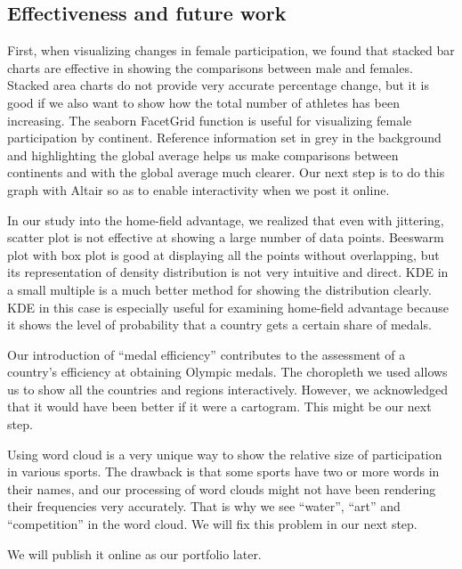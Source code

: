 \documentclass[12pt]{article}
\begin{document}
\subsection{Effectiveness and future work}
First, when visualizing changes in female participation, we found that stacked bar charts are effective in showing the comparisons between male and females. Stacked area charts do not provide very accurate percentage change, but it is good if we also want to show how the total number of athletes has been increasing. The seaborn FacetGrid function is useful for visualizing female participation by continent. Reference information set in grey in the background and highlighting the global average helps us make comparisons between continents and with the global average much clearer. Our next step is to do this graph with Altair so as to enable interactivity when we post it online. 

In our study into the home-field advantage, we realized that even with jittering, scatter plot is not effective at showing a large number of data points. Beeswarm plot with box plot is good at displaying all the points without overlapping, but its representation of density distribution is not very intuitive and direct. KDE in a small multiple is a much better method for showing the distribution clearly. KDE in this case is especially useful for examining home-field advantage because it shows the level of probability that a country gets a certain share of medals. 

Our introduction of “medal efficiency” contributes to the assessment of a country’s efficiency at obtaining Olympic medals. The choropleth we used allows us to show all the countries and regions interactively. However, we acknowledged that it would have been better if it were a cartogram.  This might be our next step. 

Using word cloud is a very unique way to show the relative size of participation in various sports. The drawback is that some sports have two or more words in their names, and our processing of word clouds might not have been rendering their frequencies very accurately. That is why we see “water”, “art” and “competition” in the word cloud. We will fix this problem in our next step. 

We will publish it online as our portfolio later. 
\end{document}
